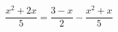 \begin{ex}
	\begin{condition}
		\( \dfrac{x^2+2x}{5}=\dfrac{3-x}{2}-\dfrac{x^2+x}{5}\)
	\end{condition}
\end{ex}
